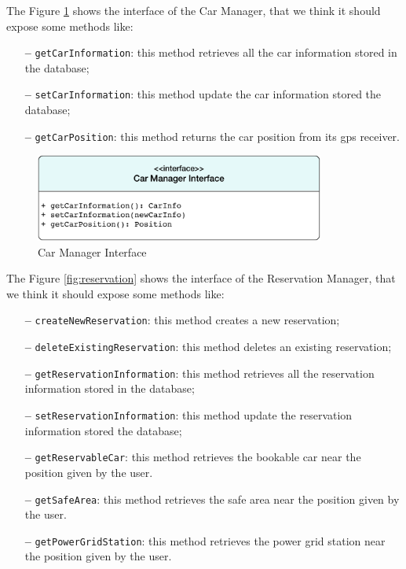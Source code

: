 \newline
The Figure \ref{fig:car} shows the interface of the Car Manager, that we think it should expose some methods like:

\begin{itemize}
\item[\textbf{--}] \texttt{getCarInformation}: this method retrieves all the car information stored in the database;
\item[\textbf{--}] \texttt{setCarInformation}: this method update the car information stored the database;
\item[\textbf{--}] \texttt{getCarPosition}: this method returns the car position from its \acs{gps} receiver.
\end{itemize}

\begin{figure}[htbp]
\centering
\vspace{72pt}
\includegraphics[width=0.85\textwidth]{Images/CarManager.pdf}
\vspace{10pt}
\caption{Car Manager Interface}
\label{fig:car}
\end{figure}
\clearpage

\newline
The Figure \ref{fig:reservation} shows the interface of the Reservation Manager, that we think it should expose some methods like:

\begin{itemize}
\item[\textbf{--}] \texttt{createNewReservation}: this method creates a new reservation;
\item[\textbf{--}] \texttt{deleteExistingReservation}: this method deletes an existing reservation;
\item[\textbf{--}] \texttt{getReservationInformation}: this method retrieves all the reservation information stored in the database;
\item[\textbf{--}] \texttt{setReservationInformation}: this method update the reservation information stored the database;
\item[\textbf{--}] \texttt{getReservableCar}: this method retrieves the bookable car near the position given by the user.
\item[\textbf{--}] \texttt{getSafeArea}: this method retrieves the safe area near the position given by the user.
\item[\textbf{--}] \texttt{getPowerGridStation}: this method retrieves the power grid station near the position given by the user.
\end{itemize}

